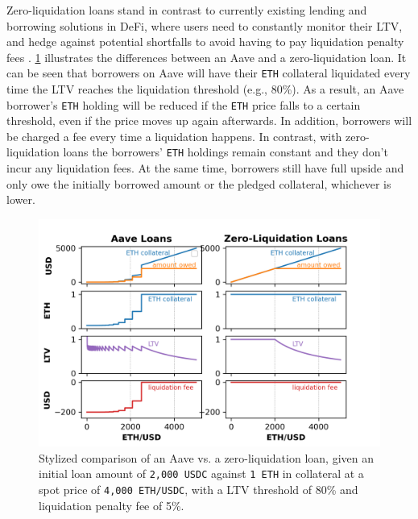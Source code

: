 \documentclass[a4paper]{article}
\begin{document}
Zero-liquidation loans stand in contrast to currently existing lending and borrowing solutions in DeFi, where users need to constantly monitor their LTV, and hedge against potential shortfalls to avoid having to pay liquidation penalty fees \cite{willtoshower} \cite{interoperate}. \cref{fig:aave_vs_zero_liquidation} illustrates the differences between an Aave and a zero-liquidation loan. It can be seen that borrowers on Aave will have their \verb|ETH| collateral liquidated every time the LTV reaches the liquidation threshold (e.g., 80\%). As a result, an Aave borrower's \verb|ETH| holding will be reduced if the \verb|ETH| price falls to a certain threshold, even if the price moves up again afterwards. In addition, borrowers will be charged a fee every time a liquidation happens. In contrast, with zero-liquidation loans the borrowers' \verb|ETH| holdings remain constant and they don't incur any liquidation fees. At the same time, borrowers still have full upside and only owe the initially borrowed amount or the pledged collateral, whichever is lower.

\begin{figure}
    \centering
    \includegraphics[width=1.0\textwidth]{figures/aave_vs_zero_liquidation.png} 
    \cprotect\caption{\small Stylized comparison of an Aave vs. a zero-liquidation loan, given an initial loan amount of \verb|2,000 USDC| against \verb|1 ETH| in collateral at a spot price of \verb|4,000 ETH/USDC|, with a LTV threshold of 80\% and liquidation penalty fee of 5\%.}
    \label{fig:aave_vs_zero_liquidation}
\end{figure}
\end{document}
